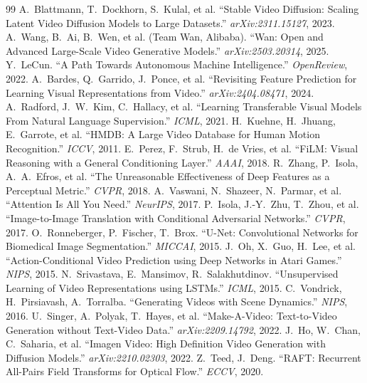 \documentclass[10pt,twocolumn,letterpaper]{article}
\begin{document}
{
    \small
    
    \begin{thebibliography}{99}
         A.~Blattmann, T.~Dockhorn, S.~Kulal, et al.
        ``Stable Video Diffusion: Scaling Latent Video Diffusion Models to
        Large Datasets.'' \textit{arXiv:2311.15127}, 2023.
         A.~Wang, B.~Ai, B.~Wen, et al. (Team Wan, Alibaba).
``Wan: Open and Advanced Large-Scale Video Generative Models.''
\textit{arXiv:2503.20314}, 2025.
         Y.~LeCun. ``A Path Towards Autonomous Machine
        Intelligence.'' \textit{OpenReview}, 2022.
         A.~Bardes, Q.~Garrido, J.~Ponce, et al.
        ``Revisiting Feature Prediction for Learning Visual Representations
        from Video.'' \textit{arXiv:2404.08471}, 2024.
         A.~Radford, J.~W.~Kim, C.~Hallacy, et al.
        ``Learning Transferable Visual Models From Natural Language
        Supervision.'' \textit{ICML}, 2021.
         H.~Kuehne, H.~Jhuang, E.~Garrote, et al.
        ``HMDB: A Large Video Database for Human Motion Recognition.''
        \textit{ICCV}, 2011.
         E.~Perez, F.~Strub, H.~de Vries, et al.
        ``FiLM: Visual Reasoning with a General Conditioning Layer.''
        \textit{AAAI}, 2018.
         R.~Zhang, P.~Isola, A.~A.~Efros, et al.
        ``The Unreasonable Effectiveness of Deep Features as a Perceptual
        Metric.'' \textit{CVPR}, 2018.
         A.~Vaswani, N.~Shazeer, N.~Parmar, et al.
        ``Attention Is All You Need.'' \textit{NeurIPS}, 2017.
         P.~Isola, J.-Y.~Zhu, T.~Zhou, et al.
        ``Image-to-Image Translation with Conditional Adversarial
        Networks.'' \textit{CVPR}, 2017.
         O.~Ronneberger, P.~Fischer, T.~Brox.
        ``U-Net: Convolutional Networks for Biomedical Image Segmentation.''
        \textit{MICCAI}, 2015.
         J.~Oh, X.~Guo, H.~Lee, et al.
        ``Action-Conditional Video Prediction using Deep Networks in Atari
        Games.'' \textit{NIPS}, 2015.
         N.~Srivastava, E.~Mansimov,
        R.~Salakhutdinov. ``Unsupervised Learning of Video Representations
        using LSTMs.'' \textit{ICML}, 2015.
         C.~Vondrick, H.~Pirsiavash, A.~Torralba.
        ``Generating Videos with Scene Dynamics.'' \textit{NIPS}, 2016.
         U.~Singer, A.~Polyak, T.~Hayes, et al.
        ``Make-A-Video: Text-to-Video Generation without Text-Video
        Data.'' \textit{arXiv:2209.14792}, 2022.
         J.~Ho, W.~Chan, C.~Saharia, et al.
        ``Imagen Video: High Definition Video Generation with Diffusion
        Models.'' \textit{arXiv:2210.02303}, 2022.
         Z.~Teed, J.~Deng.
        ``RAFT: Recurrent All-Pairs Field Transforms for Optical Flow.''
        \textit{ECCV}, 2020.
    \end{thebibliography}
}
\end{document}
